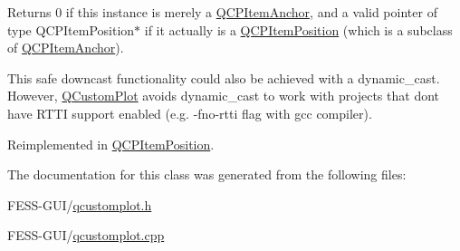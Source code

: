 Returns 0 if this instance is merely a \hyperlink{class_q_c_p_item_anchor}{Q\+C\+P\+Item\+Anchor}, and a valid pointer of type Q\+C\+P\+Item\+Position$\ast$ if it actually is a \hyperlink{class_q_c_p_item_position}{Q\+C\+P\+Item\+Position} (which is a subclass of \hyperlink{class_q_c_p_item_anchor}{Q\+C\+P\+Item\+Anchor}).

This safe downcast functionality could also be achieved with a dynamic\+\_\+cast. However, \hyperlink{class_q_custom_plot}{Q\+Custom\+Plot} avoids dynamic\+\_\+cast to work with projects that don\textquotesingle{}t have R\+T\+TI support enabled (e.\+g. -\/fno-\/rtti flag with gcc compiler). 

Reimplemented in \hyperlink{class_q_c_p_item_position_a577a7efc601df85a20b3e709d1ac320e}{Q\+C\+P\+Item\+Position}.



The documentation for this class was generated from the following files\+:\begin{DoxyCompactItemize}
\item 
F\+E\+S\+S-\/\+G\+U\+I/\hyperlink{qcustomplot_8h}{qcustomplot.\+h}\item 
F\+E\+S\+S-\/\+G\+U\+I/\hyperlink{qcustomplot_8cpp}{qcustomplot.\+cpp}\end{DoxyCompactItemize}
